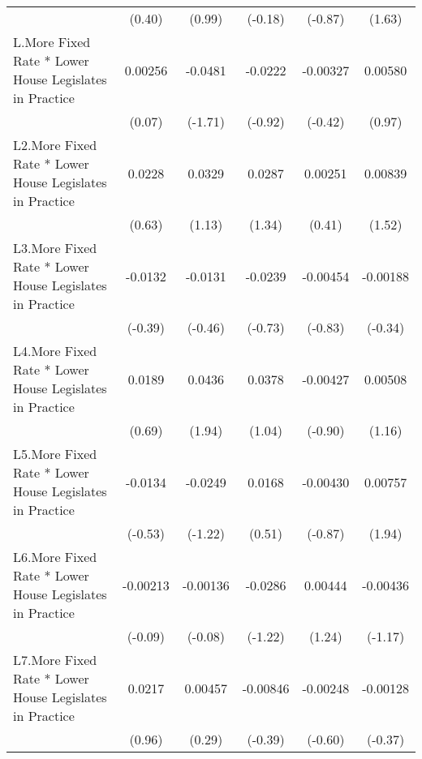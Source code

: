 {\begin{longtable}{l*{5}{c}}
                &   (0.40)         &   (0.99)         &  (-0.18)         &  (-0.87)         &   (1.63)         \\
\addlinespace
L.More Fixed Rate * Lower House Legislates in Practice&  0.00256         &  -0.0481         &  -0.0222         & -0.00327         &  0.00580         \\
                &   (0.07)         &  (-1.71)         &  (-0.92)         &  (-0.42)         &   (0.97)         \\
\addlinespace
L2.More Fixed Rate * Lower House Legislates in Practice&   0.0228         &   0.0329         &   0.0287         &  0.00251         &  0.00839         \\
                &   (0.63)         &   (1.13)         &   (1.34)         &   (0.41)         &   (1.52)         \\
\addlinespace
L3.More Fixed Rate * Lower House Legislates in Practice&  -0.0132         &  -0.0131         &  -0.0239         & -0.00454         & -0.00188         \\
                &  (-0.39)         &  (-0.46)         &  (-0.73)         &  (-0.83)         &  (-0.34)         \\
\addlinespace
L4.More Fixed Rate * Lower House Legislates in Practice&   0.0189         &   0.0436         &   0.0378         & -0.00427         &  0.00508         \\
                &   (0.69)         &   (1.94)         &   (1.04)         &  (-0.90)         &   (1.16)         \\
\addlinespace
L5.More Fixed Rate * Lower House Legislates in Practice&  -0.0134         &  -0.0249         &   0.0168         & -0.00430         &  0.00757         \\
                &  (-0.53)         &  (-1.22)         &   (0.51)         &  (-0.87)         &   (1.94)         \\
\addlinespace
L6.More Fixed Rate * Lower House Legislates in Practice& -0.00213         & -0.00136         &  -0.0286         &  0.00444         & -0.00436         \\
                &  (-0.09)         &  (-0.08)         &  (-1.22)         &   (1.24)         &  (-1.17)         \\
\addlinespace
L7.More Fixed Rate * Lower House Legislates in Practice&   0.0217         &  0.00457         & -0.00846         & -0.00248         & -0.00128         \\
                &   (0.96)         &   (0.29)         &  (-0.39)         &  (-0.60)         &  (-0.37)         \\

\end{longtable}}
